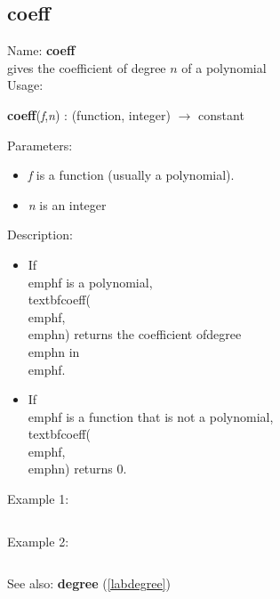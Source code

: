 \subsection{coeff}
\label{labcoeff}
\noindent Name: \textbf{coeff}\\
gives the coefficient of degree $n$ of a polynomial\\
\noindent Usage: 
\begin{center}
\textbf{coeff}(\emph{f},\emph{n}) : (\textsf{function}, \textsf{integer}) $\rightarrow$ \textsf{constant}\\
\end{center}
Parameters: 
\begin{itemize}
\item \emph{f} is a function (usually a polynomial).
\item \emph{n} is an integer
\end{itemize}
\noindent Description: \begin{itemize}

\item If \\emph{f} is a polynomial, \\textbf{coeff}(\\emph{f}, \\emph{n}) returns the coefficient of\n   degree \\emph{n} in \\emph{f}.\n
\item If \\emph{f} is a function that is not a polynomial, \\textbf{coeff}(\\emph{f}, \\emph{n}) returns 0.\n\end{itemize}
\noindent Example 1: 
\begin{center}\begin{minipage}{15cm}\begin{Verbatim}[frame=single]
\end{Verbatim}
\end{minipage}\end{center}
\noindent Example 2: 
\begin{center}\begin{minipage}{15cm}\begin{Verbatim}[frame=single]
\end{Verbatim}
\end{minipage}\end{center}
See also: \textbf{degree} (\ref{labdegree})
